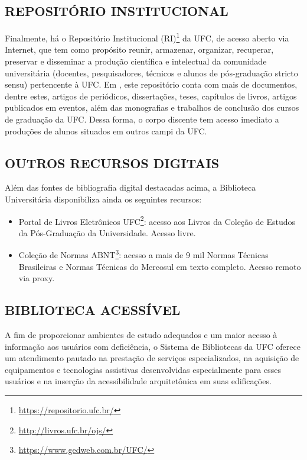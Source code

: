 \subsection{REPOSITÓRIO INSTITUCIONAL}

Finalmente, há o Repositório Institucional (RI)\footnote{\url{https://repositorio.ufc.br/}} da UFC, de acesso aberto via Internet, que tem como propósito reunir, armazenar, organizar, recuperar, preservar e disseminar a produção científica e intelectual da comunidade universitária (docentes, pesquisadores, técnicos e alunos de pós-graduação stricto sensu) pertencente à UFC. Em \ufcBCQAnoReferencia, este repositório conta com mais de \ufcBCQDocsRepositorio documentos, dentre estes, artigos de periódicos, dissertações, teses, capítulos de livros, artigos publicados em eventos, além das monografias e trabalhos de conclusão dos cursos de graduação da UFC. Dessa forma, o corpo discente tem acesso imediato a produções de alunos situados em outros campi da UFC.

\subsection{OUTROS RECURSOS DIGITAIS}

Além das fontes de bibliografia digital destacadas acima, a Biblioteca Universitária disponibiliza ainda os seguintes recursos:
\begin{itemize}
    \item Portal de Livros Eletrônicos UFC\footnote{\url{http://livros.ufc.br/ojs/}}: acesso aos Livros da Coleção de Estudos da Pós-Graduação da Universidade. Acesso livre.
    \item Coleção de Normas ABNT\footnote{\url{https://www.gedweb.com.br/UFC/}}: acesso a mais de 9 mil Normas Técnicas Brasileiras e Normas Técnicas do Mercosul em texto completo. Acesso remoto via proxy.
\end{itemize}

\subsection{BIBLIOTECA ACESSÍVEL}

A fim de proporcionar ambientes de estudo adequados e um maior acesso à informação aos usuários com deficiência, o Sistema de Bibliotecas da UFC oferece um atendimento pautado na prestação de serviços especializados, na aquisição de equipamentos e tecnologias assistivas desenvolvidas especialmente para esses usuários e na inserção da acessibilidade arquitetônica em suas edificações.

